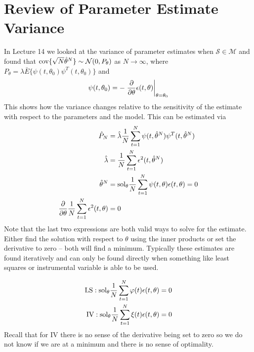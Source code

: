 
\mainmatter
\setcounter{page}{1}

\lectureseries[\course]{\course}

\date{November 17, 2009}

\setaddress

\setcounter{lecture}{14}
\setcounter{chapter}{14}


\section{Review of Parameter Estimate Variance}
In Lecture 14 we looked at the variance of parameter estimates when $\mathcal{S}\in\mathcal{M}$ and found that $\text{cov}\{\sqrt{N}\hat{\theta}^N\} \sim \mathcal{N}(0,P_\theta)$ as $N\to\infty$, where $P_\theta = \lambda\bar{E}\{\psi(t,\theta_0)\psi^T(t,\theta_0)\}$ and
$$\psi(t,\theta_0) = -\left.\frac{\partial}{\partial\theta}\epsilon(t,\theta)\right|_{\theta=\theta_0}$$
This shows how the variance changes relative to the sensitivity of the estimate with respect to the parameters and the model. This can be estimated via
\begin{align*}
\hat{P}_N &= \hat{\lambda}\frac{1}{N}\sum_{t=1}^N\psi(t,\hat{\theta}^N)\psi^T(t,\hat{\theta}^N) \\
\hat{\lambda} &= \frac{1}{N}\sum_{t=1}^N\epsilon^2(t,\hat{\theta}^N) \\
\hat{\theta}^N &= \text{sol}_\theta\frac{1}{N}\sum_{t=1}^N\psi(t,\theta)\epsilon(t,\theta) = 0 \\
\frac{\partial}{\partial\theta}\frac{1}{N}\sum_{t=1}^N\epsilon^2(t,\theta) &= 0
\end{align*}
Note that the last two expressions are both valid ways to solve for the estimate. Either find the solution with respect to $\theta$ using the inner products or set the derivative to zero -- both will find a minimum. Typically these estimates are found iteratively and can only be found directly when something like least squares or instrumental variable is able to be used.

\begin{align*}
\text{LS}: \text{sol}_\theta \frac{1}{N}\sum_{t=1}^N\varphi(t)\epsilon(t,\theta) = 0 \\
\text{IV}: \text{sol}_\theta \frac{1}{N}\sum_{t=1}^N\xi(t)\epsilon(t,\theta) = 0
\end{align*}
Recall that for IV there is no sense of the derivative being set to zero so we do not know if we are at a minimum and there is no sense of optimality.


